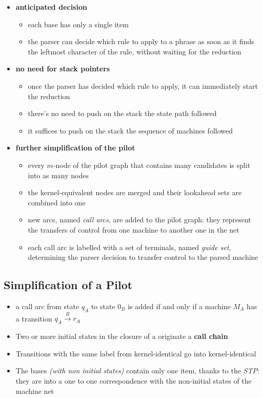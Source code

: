 \documentclass[english]{article}
\begin{document}
\begin{itemize}
  \item \textbf{anticipated decision}
        \begin{itemize}[label=\(\rightarrow\)]
          \item each \mstate base has only a single item
          \item the parser can decide which rule to apply to a phrase as soon as it finds the leftmost character of the rule, without waiting for the reduction
        \end{itemize}
  \item \textbf{no need for stack pointers}
        \begin{itemize}[label=\(\rightarrow\)]
          \item once the parser has decided which rule to apply, it can immediately start the reduction
          \item there's no need to push on the stack the state path followed
          \item it suffices to push on the stack the sequence of machines followed
        \end{itemize}
  \item \textbf{further simplification of the pilot}
        \begin{itemize}[label=\(\rightarrow\)]
          \item every \(m\)-node of the pilot graph that contains many candidates is split into as many nodes
          \item the kernel-equivalent nodes are merged and their lookahead sets are combined into one
          \item new arcs, named \textit{call arcs}, are added to the pilot graph: they represent the transfers of control from one machine to another one in the net
          \item each call arc is labelled with a set of terminals, named \textit{guide set}, determining the parser decision to transfer control to the parsed machine
        \end{itemize}
\end{itemize}

\subsection[Simplification of a ELL(1) Pilot]{Simplification of a \ello Pilot}

\begin{itemize}
  \item a call arc from state \(q_A\) to state \(0_B\) is added if and only if a machine \(M_A\) has a transition \(q_A \xrightarrow{B} r_A\)
  \item Two or more initial states in the closure of a \mstate originate a \textbf{call chain}
  \item Transitions with the same label from kernel-identical \mstates go into kernel-identical \mstates
  \item The \mstate bases \textit{(with non initial states)} contain only one item, thanks to the \textit{STP}: they are into a one to one correspondence with the non-initial states of the machine net
\end{itemize}
\end{document}

